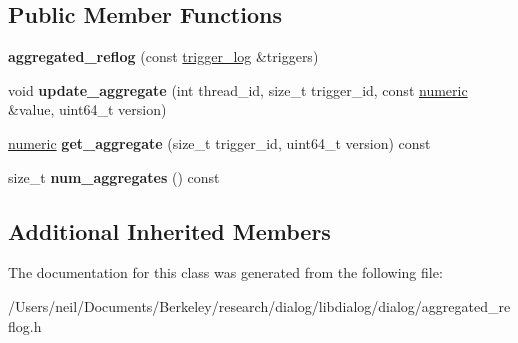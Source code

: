 \subsection*{Public Member Functions}
\begin{DoxyCompactItemize}
\item 
\mbox{\label{classdialog_1_1aggregated__reflog_a9f147eea512b45937d1594a9e71d1ec2}} 
{\bfseries aggregated\+\_\+reflog} (const \hyperlink{classdialog_1_1monolog_1_1monolog__exp2__linear}{trigger\+\_\+log} \&triggers)
\item 
\mbox{\label{classdialog_1_1aggregated__reflog_a5a81c6f3c706939b6b01e5be033c4d30}} 
void {\bfseries update\+\_\+aggregate} (int thread\+\_\+id, size\+\_\+t trigger\+\_\+id, const \hyperlink{classdialog_1_1numeric}{numeric} \&value, uint64\+\_\+t version)
\item 
\mbox{\label{classdialog_1_1aggregated__reflog_a66d8a6b5f325dc0310cafddc8a76b2a0}} 
\hyperlink{classdialog_1_1numeric}{numeric} {\bfseries get\+\_\+aggregate} (size\+\_\+t trigger\+\_\+id, uint64\+\_\+t version) const
\item 
\mbox{\label{classdialog_1_1aggregated__reflog_adb7909e37a83c8ad9fb727c4b338392e}} 
size\+\_\+t {\bfseries num\+\_\+aggregates} () const
\end{DoxyCompactItemize}
\subsection*{Additional Inherited Members}


The documentation for this class was generated from the following file\+:\begin{DoxyCompactItemize}
\item 
/\+Users/neil/\+Documents/\+Berkeley/research/dialog/libdialog/dialog/aggregated\+\_\+reflog.\+h\end{DoxyCompactItemize}
